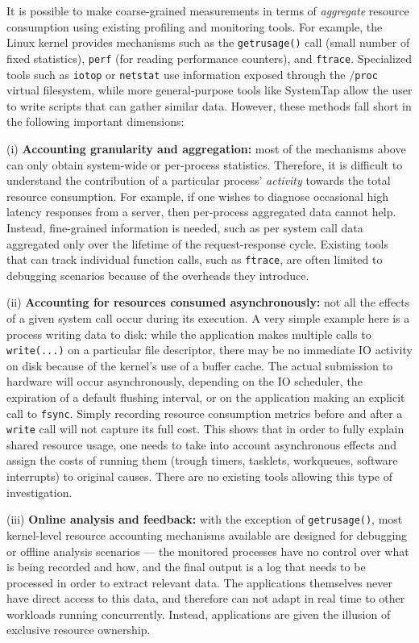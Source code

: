 \documentclass[letterpaper,twocolumn,10pt]{article}
\begin{document}
It is possible to make coarse-grained measurements in terms of
\textit{aggregate} resource consumption using existing profiling and monitoring
tools. For example, the Linux kernel provides mechanisms such as the \texttt{getrusage()} call
(small number of fixed statistics), \texttt{perf} (for reading performance
counters), and \texttt{ftrace}. Specialized tools such as \texttt{iotop} or
\texttt{netstat} use information exposed through the \texttt{$/$proc}
virtual filesystem, while more general-purpose tools like SystemTap allow the
user to write scripts that can gather similar data. However, these methods fall
short in the following important dimensions:

(i) \textbf{Accounting granularity and aggregation:} most of the mechanisms
above can only obtain system-wide or per-process statistics. Therefore, it is
difficult to understand the contribution of a particular process'
\textit{activity} towards the total resource consumption. For example, if one
wishes to diagnose occasional high latency responses from a server, then
per-process aggregated data cannot help. Instead, fine-grained information is
needed, such as per system call data aggregated only over the lifetime of the
request-response cycle. Existing tools that can track individual function calls,
such as \texttt{ftrace}, are often limited to debugging scenarios because of the overheads
they introduce.

(ii) \textbf{Accounting for resources consumed asynchronously:} not all the
effects of a given system call occur during its execution. A very simple example
here is a process writing data to disk: while the application makes multiple
calls to \texttt{write(...)} on a particular file descriptor, there may be no
immediate IO activity on disk because of the kernel's use of a buffer cache. The
actual submission to hardware will occur asynchronously, depending on the IO
scheduler, the expiration of a default flushing interval, or on the application
making an explicit call to \texttt{fsync}. Simply recording resource consumption
metrics before and after a \texttt{write} call will not capture its full cost.
This shows that in order to fully explain shared resource usage, one needs to
take into account asynchronous effects and assign the costs of running them (trough timers, tasklets,
workqueues, software interrupts) to original causes. There are no existing tools allowing this type
of investigation.

(iii) \textbf{Online analysis and feedback:} with the exception of
\texttt{getrusage()}, most kernel-level resource accounting mechanisms available
are designed for debugging or offline analysis scenarios --- the monitored
processes have no control over what is being recorded and how, and the final
output is a log that needs to be processed in order to extract relevant data.
The applications themselves never have direct access to this data, and therefore
can not adapt in real time to other workloads running concurrently. Instead,
applications are given the illusion of exclusive resource ownership.
\end{document}
